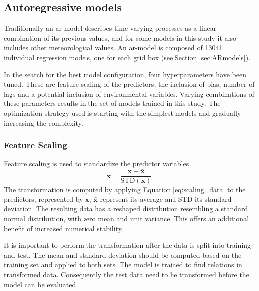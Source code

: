 \subsection{Autoregressive models}
Traditionally an \acrshort{ar}-model describes time-varying processes as a linear combination of its previous values, and for some models in this study it also includes other meteorological values. An \acrshort{ar}-model is composed of 13041 individual regression models, one for each grid box (see Section \ref{sec:ARmodels}). 

In the search for the best model configuration, four hyperparameters have been tuned. These are
feature scaling of the predictors, the inclusion of bias, number of lags and a potential inclusion of environmental variables. Varying combinations of these parameters results in the set of models trained in this study. 
The optimization strategy used is starting with the simplest models and gradually increasing the complexity.

\subsubsection{Feature Scaling} \label{sec:scaling_predictors}
Feature scaling is used to standardize the predictor variables.
\begin{equation} \label{eq:scaling_data}
    \mathbf{x} = \frac{\mathbf{x} - \bar{\mathbf{x}}}{\text{STD}(\mathbf{x})}
\end{equation}
The transformation is computed by applying Equation \eqref{eq:scaling_data} to the predictors, represented by $\mathbf{x}$, $\bar{\mathbf{x}}$ represent its average and STD its standard deviation. The resulting data has a reshaped distribution resembling a standard normal distribution, with zero mean and unit variance. This offers an additional benefit of increased numerical stability. %

It is important to perform the transformation after the data is split into training and test. The mean and standard deviation should be computed based on the training set and applied to both sets. The model is trained to find relations in transformed data. Consequently the test data need to be transformed before the model can be evaluated. 

